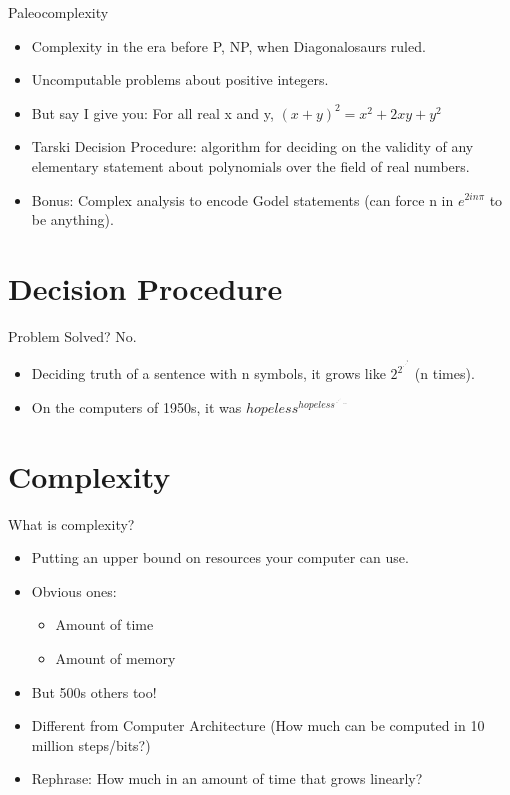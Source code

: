 \documentclass[
    11pt, %
    aspectratio=169, %
]{beamer}
\begin{document}
\begin{frame}{Paleocomplexity}
\begin{itemize}
    \item Complexity in the era before P, NP, when Diagonalosaurs ruled. 
    \item Uncomputable problems about positive integers.
    \item But say I give you: For all real x and y, $(x + y)^2 = x^2 + 2xy + y^2$
    \item Tarski Decision Procedure: algorithm for deciding on the validity of any elementary statement about polynomials over the field of real numbers. 
    \item Bonus: Complex analysis to encode Godel statements (can force n in $e^{2in\pi}$ to be anything).
\end{itemize}
\end{frame}

\section{Decision Procedure}
\begin{frame}{Problem Solved? No.}
    \begin{itemize}
        \item Deciding truth of a sentence with n symbols, it grows like \def\rddots#1{\cdot^{\cdot^{\cdot^{#1}}}}
$ 2^{2^{\rddots2}} $
\bye (n times).
        \item On the computers of 1950s, it was \def\rddots#1{\cdot^{\cdot^{\cdot^{#1}}}}
$ hopeless^{hopeless^{\rddots...}} $
    \end{itemize}
\end{frame}

\section{Complexity}
\begin{frame}{What is complexity?}
    \begin{itemize}
        \item Putting an upper bound on resources your computer can use.
        \item Obvious ones:
        \begin{itemize}
            \item Amount of time
            \item Amount of memory
        \end{itemize}
        \item But 500s others too! 
        \item Different from Computer Architecture (How much can be computed in 10 million steps/bits?)
        \item Rephrase: How much in an amount of time that grows linearly?
    \end{itemize}
\end{frame}
\end{document}
